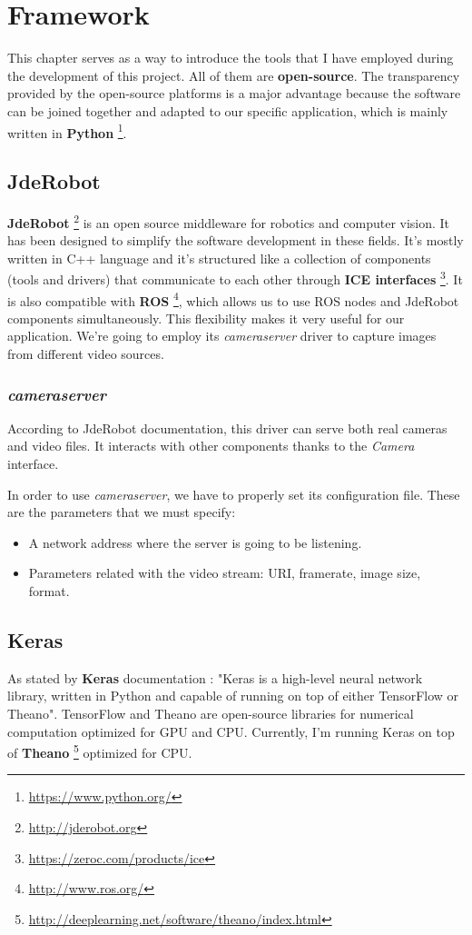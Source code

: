 \chapter{Framework}\label{cap.framework}
This chapter serves as a way to introduce the tools that I have employed during the development of this project. All of them are \textbf{open-source}. The transparency provided by the open-source platforms is a major advantage because the software can be joined together and adapted to our specific application, which is mainly written in \textbf{Python} \footnote{\url{https://www.python.org/}}.

\section{JdeRobot}
\textbf{JdeRobot} \footnote{\url{http://jderobot.org}} is an open source middleware for robotics and computer vision. It has been designed to simplify the software development in these fields. It's mostly written in C++ language and it's structured like a collection of components (tools and drivers) that communicate to each other through \textbf{ICE interfaces} \footnote{\url{https://zeroc.com/products/ice}}. It is also compatible with \textbf{ROS} \footnote{\url{http://www.ros.org/}}, which allows us to use ROS nodes and JdeRobot components simultaneously. This flexibility makes it very useful for our application.
We're going to employ its \textit{cameraserver} driver to capture images from different video sources.

\subsection{\textit{cameraserver}}
According to JdeRobot documentation, this driver can serve both real cameras and video files. It interacts with other components thanks to the \textit{Camera} interface.

In order to use \textit{cameraserver}, we have to properly set its configuration file. These are the parameters that we must specify:
\begin{itemize}
    \item A network address where the server is going to be listening.
    \item Parameters related with the video stream: URI, framerate, image size, format.
\end{itemize}

\section{Keras}
As stated by \textbf{Keras} documentation \cite{chollet2015keras}: "Keras is a high-level neural network library, written in Python and capable of running on top of either TensorFlow or Theano". TensorFlow and Theano are open-source libraries for numerical computation optimized for GPU and CPU. Currently, I'm running Keras on top of \textbf{Theano} \footnote{\url{http://deeplearning.net/software/theano/index.html}} optimized for CPU.

